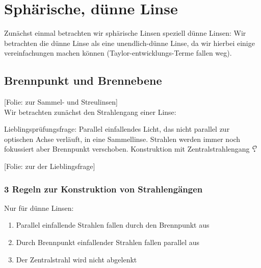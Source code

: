\documentclass[titlepage,11pt,a4paper,ngerman]{report}
\newcommand{\folie}[1]{\color{gray}[Folie: #1]\color{black}}
\newcommand{\lcom}[1]{\color{MidnightBlue}#1\color{black}}
\newcommand{\mau}{$\buildrel \mathcal{O} \over{\textbf{.}}$}
\newcommand{\rbox}[1]{\begin{tcolorbox}[colback=white,colframe=red!75!black]#1\end{tcolorbox}}
\begin{document}
\section{Sphärische, dünne Linse}
\lcom{Zunächst einmal betrachten wir sphärische Linsen speziell dünne Linsen: Wir betrachten die dünne Linse als eine unendlich-dünne Linse, da wir hierbei einige vereinfachungen machen können (Taylor-entwicklungs-Terme fallen weg).}

\subsection{Brennpunkt und Brennebene}
\folie{zur Sammel- und Streulinsen}\\
Wir betrachten zunächst den Strahlengang einer Linse:\\
\rbox{\begin{minipage}{\linewidth}
		\lcom{Lieblingsprüfungsfrage: Parallel einfallendes Licht, das nicht parallel zur optischen Achse verläuft, in eine Sammellinse. Strahlen werden immer noch fokussiert aber Brennpunkt verschoben. Konstruktion mit Zentralstrahlengang \mau}
	\end{minipage}}
\noindent
\folie{zur der Lieblingsfrage}

\subsubsection{3 Regeln zur Konstruktion von Strahlengängen}
Nur für dünne Linsen:
\begin{enumerate}[1)]
	\item Parallel einfallende Strahlen fallen durch den Brennpunkt aus
	\item Durch Brennpunkt einfallender Strahlen fallen parallel aus
	\item Der Zentralstrahl wird nicht abgelenkt
\end{enumerate}
\end{document}
